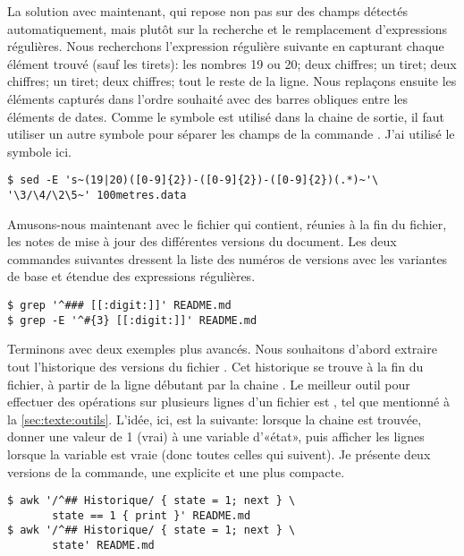 La solution avec  maintenant, qui repose non pas sur des
champs détectés automatiquement, mais plutôt sur la recherche et le
remplacement d'expressions régulières. Nous recherchons l'expression
régulière suivante en capturant chaque élément trouvé (sauf les
tirets): les nombres 19 ou 20; deux chiffres; un tiret; deux chiffres;
un tiret; deux chiffres; tout le reste de la ligne. Nous replaçons
ensuite les éléments capturés dans l'ordre souhaité avec des barres
obliques \code{/} entre les éléments de dates. Comme le symbole
\code{/} est utilisé dans la chaine de sortie, il faut utiliser un
autre symbole pour séparer les champs de la commande . J'ai
utilisé le symbole \code{~} ici.
\begin{Schunk}
\begin{Verbatim}
$ sed -E 's~(19|20)([0-9]{2})-([0-9]{2})-([0-9]{2})(.*)~'\
'\3/\4/\2\5~' 100metres.data
\end{Verbatim}
\end{Schunk}

Amusons-nous maintenant avec le fichier  qui contient,
réunies à la fin du fichier, les notes de mise à jour des différentes
versions du document. Les deux commandes suivantes dressent la liste
des numéros de versions avec les variantes de base et étendue
des expressions régulières.
\begin{Schunk}
\begin{Verbatim}
$ grep '^### [[:digit:]]' README.md
$ grep -E '^#{3} [[:digit:]]' README.md
\end{Verbatim}
\end{Schunk}

Terminons avec deux exemples plus avancés. Nous souhaitons d'abord
extraire tout l'historique des versions du fichier \code{README.md}.
Cet historique se trouve à la fin du fichier, à partir de la ligne
débutant par la chaine \code{\#\# Historique}. Le meilleur outil pour
effectuer des opérations sur plusieurs lignes d'un fichier est
, tel que mentionné à la \autoref{sec:texte:outils}.
L'idée, ici, est la suivante: lorsque la chaine est trouvée, donner
une valeur de 1 (vrai) à une variable d'«état», puis afficher les
lignes lorsque la variable est vraie (donc toutes celles qui suivent).
Je présente deux versions de la commande, une explicite et une plus
compacte.
\begin{Schunk}
\begin{Verbatim}
$ awk '/^## Historique/ { state = 1; next } \
       state == 1 { print }' README.md
$ awk '/^## Historique/ { state = 1; next } \
       state' README.md
\end{Verbatim}
\end{Schunk}

